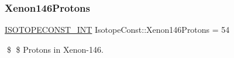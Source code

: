 \subsubsection{\texorpdfstring{Xenon146\+Protons}{Xenon146Protons}}
{\footnotesize\ttfamily \mbox{\hyperlink{group___isotope_const-_macros_ga5f18360b3e99483a35c32d789e62621c}{I\+S\+O\+T\+O\+P\+E\+C\+O\+N\+S\+T\+\_\+\+I\+NT}} Isotope\+Const\+::\+Xenon146\+Protons = 54}

\$ \$ Protons in Xenon-\/146. 